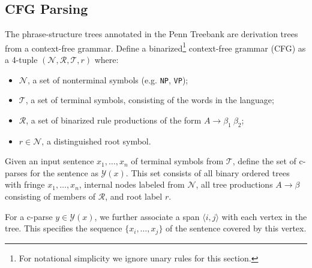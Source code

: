 \documentclass[11pt,letterpaper]{article}
\newcommand{\nonterms}{\mathcal{N}}
\newcommand{\rules}{\mathcal{R}}
\newcommand{\terms}{\mathcal{T}}
\newcommand{\Span}[1]{\langle #1 \rangle}
\newcommand{\Tag}[1]{\texttt{#1}}
\newcommand{\Root}{r}
\newcommand{\Rule}[3]{#1 \rightarrow #2\ #3}
\newcommand{\RuleA}[3]{#1 \rightarrow #2^*\ #3}
\newcommand{\RuleB}[3]{#1 \rightarrow #2\ #3^*}
\begin{document}

\subsection{CFG Parsing}

The phrase-structure trees annotated in the Penn Treebank are derivation trees from a context-free grammar. 
Define a binarized\footnote{For notational simplicity we ignore unary rules for this section.} context-free grammar (CFG) as a 4-tuple $(\nonterms, \rules, \terms, \Root)$ where:
\begin{itemize}
\item $\nonterms$, a set of nonterminal symbols (e.g. \Tag{NP},
  \Tag{VP});
\item $\terms$, a set of terminal symbols, consisting of the
  words in the language;
\item $\rules$, a set of binarized rule productions
  of the form $\Rule{A}{\beta_1}{\beta_2}$;
\item $\Root \in \nonterms$, a distinguished root symbol.
\end{itemize}


Given an input sentence $x_1, \ldots, x_n$ of terminal symbols from
$\terms$, define the set of c-parses for the sentence as
$\mathcal{Y}(x)$. This set consists of all binary ordered trees with
fringe $x_1, \ldots, x_n$, internal nodes labeled from $\nonterms$,
all tree productions $A \rightarrow \beta$ consisting of members of
$\rules$, and root label $\Root$.

For a c-parse $y \in \mathcal{Y}(x)$,
we further associate a span $\Span{i, j}$ with each vertex in the tree. This specifies the 
sequence $\{x_i, \ldots, x_j\}$ of the sentence covered by this vertex.


\end{document}
